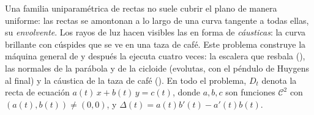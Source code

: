 \begin{problem}\label{pb:b2:curves:1}
Una familia uniparamétrica de rectas no suele cubrir el plano de
manera uniforme: las rectas se amontonan a lo largo de una curva
tangente a todas ellas, su \emph{envolvente}. Los
rayos de luz hacen visibles las  en forma de
\emph{cáusticas}: la curva brillante con cúspides que se ve en una
taza de café. Este problema construye la máquina general de
 y después la ejecuta cuatro veces: la escalera que
resbala (), las normales de la parábola y de la cicloide
(evolutas, con el péndulo de Huygens al final) y la cáustica de la
taza de café (). En todo el problema, $D_t$ denota la recta
de ecuación $a(t)\,x + b(t)\,y = c(t)$, donde $a, b, c$ son funciones
$\mathcal C^2$ con $(a(t), b(t)) \neq (0,0)$, y $\Delta(t) =
a(t)b'(t) - a'(t)b(t)$.


\end{problem}
